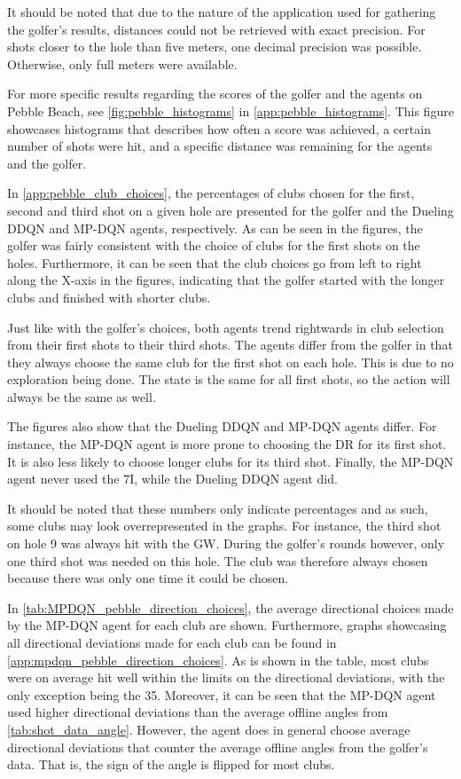 \documentclass{kththesis}
\begin{document}
It should be noted that due to the nature of the application used for gathering the golfer's results, distances could not be retrieved with exact precision. For shots closer to the hole than five meters, one decimal precision was possible. Otherwise, only full meters were available.

For more specific results regarding the scores of the golfer and the agents on Pebble Beach, see \autoref{fig:pebble_histograms} in \autoref{app:pebble_histograms}. This figure showcases histograms that describes how often a score was achieved, a certain number of shots were hit, and a specific distance was remaining for the agents and the golfer.

In \autoref{app:pebble_club_choices}, the percentages of clubs chosen for the first, second and third shot on a given hole are presented for the golfer and the Dueling DDQN and MP-DQN agents, respectively. As can be seen in the figures, the golfer was fairly consistent with the choice of clubs for the first shots on the holes. Furthermore, it can be seen that the club choices go from left to right along the X-axis in the figures, indicating that the golfer started with the longer clubs and finished with shorter clubs.

Just like with the golfer's choices, both agents trend rightwards in club selection from their first shots to their third shots. The agents differ from the golfer in that they always choose the same club for the first shot on each hole. This is due to no exploration being done. The state is the same for all first shots, so the action will always be the same as well.

The figures also show that the Dueling DDQN and MP-DQN agents differ. For instance, the MP-DQN agent is more prone to choosing the DR for its first shot. It is also less likely to choose longer clubs for its third shot. Finally, the MP-DQN agent never used the 7I, while the Dueling DDQN agent did.

It should be noted that these numbers only indicate percentages and as such, some clubs may look overrepresented in the graphs. For instance, the third shot on hole 9 was always hit with the GW. During the golfer's rounds however, only one third shot was needed on this hole. The club was therefore always chosen because there was only one time it could be chosen.

In \autoref{tab:MPDQN_pebble_direction_choices}, the average directional choices made by the MP-DQN agent for each club are shown. Furthermore, graphs showcasing all directional deviations made for each club can be found in \autoref{app:mpdqn_pebble_direction_choices}. As is shown in the table, most clubs were on average hit well within the limits on the directional deviations, with the only exception being the 35. Moreover, it can be seen that the MP-DQN agent used higher directional deviations than the average offline angles from \autoref{tab:shot_data_angle}. However, the agent does in general choose average directional deviations that counter the average offline angles from the golfer's data. That is, the sign of the angle is flipped for most clubs.
\end{document}
